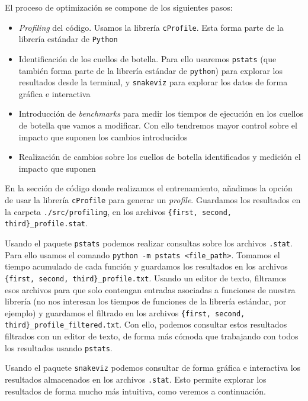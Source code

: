 El proceso de optimización se compone de los siguientes pasos:

\begin{itemize}
    \item \textit{Profiling} del código. Usamos la librería \lstinline{cProfile}. Esta forma parte de la librería estándar de \lstinline{Python}
    \item Identificación de los cuellos de botella. Para ello usaremos \lstinline{pstats} (que también forma parte de la librería estándar de \lstinline{python}) para explorar los resultados desde la terminal, y \lstinline{snakeviz} para explorar los datos de forma gráfica e interactiva
    \item Introducción de \textit{benchmarks} para medir los tiempos de ejecución en los cuellos de botella que vamos a modificar. Con ello tendremos mayor control sobre el impacto que suponen los cambios introducidos
    \item Realización de cambios sobre los cuellos de botella identificados y medición el impacto que suponen
\end{itemize}

En la sección de código donde realizamos el entrenamiento, añadimos la opción de usar la librería \lstinline{cProfile} para generar un \textit{profile}. Guardamos los resultados en la carpeta \lstinline{./src/profiling}, en los archivos \lstinline|{first, second, third}_profile.stat|.

Usando el paquete \lstinline{pstats} podemos realizar consultas sobre los archivos \lstinline{.stat}. Para ello usamos el comando \lstinline{python -m pstats <file_path>}. Tomamos el tiempo acumulado de cada función y guardamos los resultados en los archivos \lstinline|{first, second, third}_profile.txt|. Usando un editor de texto, filtramos esos archivos para que solo contengan entradas asociadas a funciones de nuestra librería (no nos interesan los tiempos de funciones de la librería estándar, por ejemplo) y guardamos el filtrado en los archivos \lstinline|{first, second, third}_profile_filtered.txt|. Con ello, podemos consultar estos resultados filtrados con un editor de texto, de forma más cómoda que trabajando con todos los resultados usando \lstinline{pstats}.

Usando el paquete \lstinline{snakeviz} podemos consultar de forma gráfica e interactiva los resultados almacenados en los archivos \lstinline{.stat}. Esto permite explorar los resultados de forma mucho más intuitiva, como veremos a continuación.


